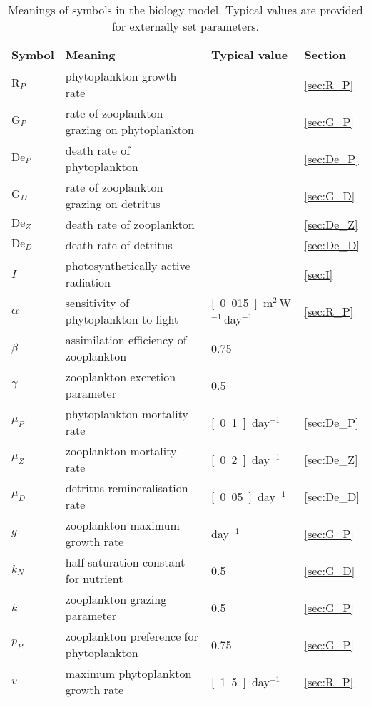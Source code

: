 \begin{table}[ht]
  \centering
  \begin{tabular}{llll}\hline
    \textbf{Symbol} & \textbf{Meaning} & \textbf{Typical value} & \textbf{Section}\\\hline
    $\mathrm{R}_P$ & phytoplankton growth rate & & \ref{sec:R_P}\\
    $\mathrm{G}_P$ & rate of zooplankton grazing on phytoplankton && \ref{sec:G_P}\\
    $\mathrm{De}_P$ & death rate of phytoplankton && \ref{sec:De_P}\\
    $\mathrm{G}_D$ & rate of zooplankton grazing on detritus && \ref{sec:G_D}\\
    $\mathrm{De}_Z$ & death rate of zooplankton && \ref{sec:De_Z}\\
    $\mathrm{De}_D$ & death rate of detritus && \ref{sec:De_D}\\
    $I$ & photosynthetically active radiation & & \ref{sec:I} \\
    $\alpha$ & sensitivity of phytoplankton to light & \unit[0.015]{m$^2$\,W$^{-1}$\,day$^{-1}$}  & \ref{sec:R_P}\\
    $\beta$ & assimilation efficiency of zooplankton & 0.75 \\
    $\gamma$ & zooplankton excretion parameter & 0.5 \\
    $\mu_P$ & phytoplankton mortality rate & \unit[0.1]{day$^{-1}$} & \ref{sec:De_P}\\
    $\mu_Z$ & zooplankton mortality rate & \unit[0.2]{day$^{-1}$} & \ref{sec:De_Z}\\
    $\mu_D$ & detritus remineralisation rate & \unit[0.05]{day$^{-1}$} & \ref{sec:De_D}\\
    $g$ & zooplankton maximum growth rate & \unit[1]{day$^{-1}$} & \ref{sec:G_P}\\
    $k_N$ & half-saturation constant for nutrient & 0.5  & \ref{sec:G_D}\\
    $k$ & zooplankton grazing parameter & 0.5 & \ref{sec:G_P}\\
    $p_P$ & zooplankton preference for phytoplankton & 0.75 & \ref{sec:G_P}\\
    $v$ & maximum phytoplankton growth rate & \unit[1.5]{day$^{-1}$} & \ref{sec:R_P}\\
    \hline
  \end{tabular}
  \caption{Meanings of symbols in the biology model. Typical values are
    provided for externally set parameters.}
  \label{tab:bioparameters}
\end{table}

